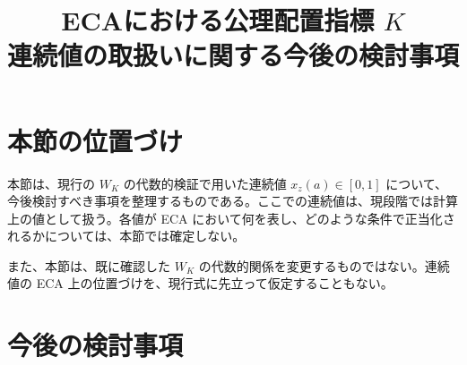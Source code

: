\documentclass[a4paper,11pt]{article}
\title{ECAにおける公理配置指標 $K$\\連続値の取扱いに関する今後の検討事項}
\author{}
\date{}
\begin{document}
\maketitle

\section{本節の位置づけ}

本節は、現行の $W_K$ の代数的検証で用いた連続値 $x_z(a)\in[0,1]$ について、今後検討すべき事項を整理するものである。ここでの連続値は、現段階では計算上の値として扱う。各値が ECA において何を表し、どのような条件で正当化されるかについては、本節では確定しない。

また、本節は、既に確認した $W_K$ の代数的関係を変更するものではない。連続値の ECA 上の位置づけを、現行式に先立って仮定することもない。

\section{今後の検討事項}
\end{document}
